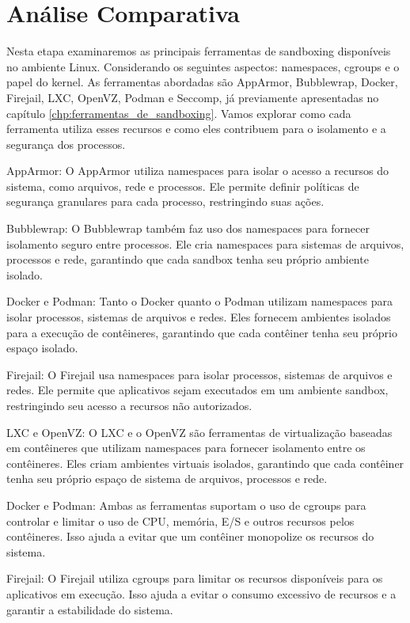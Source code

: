 \chapter{Análise Comparativa}

 Nesta etapa examinaremos as principais ferramentas de sandboxing disponíveis no ambiente Linux. Considerando os seguintes aspectos: namespaces, cgroups e o papel do kernel. As ferramentas abordadas são AppArmor, Bubblewrap, Docker, Firejail, LXC, OpenVZ, Podman e Seccomp, já previamente apresentadas no capítulo \ref{chp:ferramentas_de_sandboxing}. Vamos explorar como cada ferramenta utiliza esses recursos e como eles contribuem para o isolamento e a segurança dos processos.

    AppArmor: O AppArmor utiliza namespaces para isolar o acesso a recursos do sistema, como arquivos, rede e processos. Ele permite definir políticas de segurança granulares para cada processo, restringindo suas ações.

    Bubblewrap: O Bubblewrap também faz uso dos namespaces para fornecer isolamento seguro entre processos. Ele cria namespaces para sistemas de arquivos, processos e rede, garantindo que cada sandbox tenha seu próprio ambiente isolado.

    Docker e Podman: Tanto o Docker quanto o Podman utilizam namespaces para isolar processos, sistemas de arquivos e redes. Eles fornecem ambientes isolados para a execução de contêineres, garantindo que cada contêiner tenha seu próprio espaço isolado.

    Firejail: O Firejail usa namespaces para isolar processos, sistemas de arquivos e redes. Ele permite que aplicativos sejam executados em um ambiente sandbox, restringindo seu acesso a recursos não autorizados.

    LXC e OpenVZ: O LXC e o OpenVZ são ferramentas de virtualização baseadas em contêineres que utilizam namespaces para fornecer isolamento entre os contêineres. Eles criam ambientes virtuais isolados, garantindo que cada contêiner tenha seu próprio espaço de sistema de arquivos, processos e rede.

    Docker e Podman: Ambas as ferramentas suportam o uso de cgroups para controlar e limitar o uso de CPU, memória, E/S e outros recursos pelos contêineres. Isso ajuda a evitar que um contêiner monopolize os recursos do sistema.

    Firejail: O Firejail utiliza cgroups para limitar os recursos disponíveis para os aplicativos em execução. Isso ajuda a evitar o consumo excessivo de recursos e a garantir a estabilidade do sistema.

